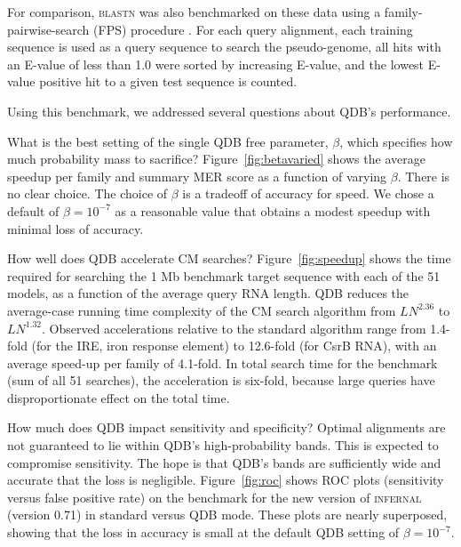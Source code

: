 \documentclass[11pt]{article}
\newif\ifdraft
\begin{document}
For comparison, \textsc{blastn} was also benchmarked on these data
using a family-pairwise-search (FPS) procedure \cite{Grundy98b}. For each
query alignment, each training sequence is used as a query sequence to
search the pseudo-genome, all hits with an E-value of less than 1.0
were sorted by increasing E-value, and the lowest E-value positive hit
to a given test sequence is counted.

Using this benchmark, we addressed several questions about QDB's
performance.

What is the best setting of the single QDB free parameter, $\beta$,
which specifies how much probability mass to sacrifice?
Figure~\ref{fig:betavaried} shows the average speedup per family and
summary MER score as a function of varying $\beta$. There is no clear
choice. The choice of $\beta$ is a tradeoff of accuracy for speed. We
chose a default of $\beta = 10^{-7}$ as a reasonable value that
obtains a modest speedup with minimal loss of accuracy.

\ifdraft

\fi

How well does QDB accelerate CM searches?  Figure~\ref{fig:speedup}
shows the time required for searching the 1 Mb benchmark target
sequence with each of the 51 models, as a function of the average
query RNA length. QDB reduces the average-case running time complexity
of the CM search algorithm from $LN^{2.36}$ to $LN^{1.32}$. Observed
accelerations relative to the standard algorithm range from 1.4-fold
(for the IRE, iron response element) to 12.6-fold (for CsrB RNA), with
an average speed-up per family of 4.1-fold. In total search time for
the benchmark (sum of all 51 searches), the acceleration is six-fold,
because large queries have disproportionate effect on the total
time.

\ifdraft

\fi

How much does QDB impact sensitivity and specificity? Optimal
alignments are not guaranteed to lie within QDB's high-probability
bands. This is expected to compromise sensitivity. The hope is
that QDB's bands are sufficiently wide and accurate that the loss is
negligible.  Figure~\ref{fig:roc} shows ROC plots (sensitivity versus
false positive rate) on the benchmark for the new version of
\textsc{infernal} (version 0.71) in standard versus QDB mode.  These
plots are nearly superposed, showing that the loss in accuracy is
small at the default QDB setting of $\beta=10^{-7}$.
\end{document}
